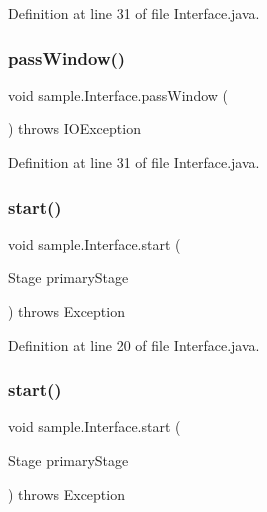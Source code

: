 Definition at line 31 of file Interface.\+java.

\mbox{\label{classsample_1_1_interface_a845d7280ea87f3cd86c8f30b997312dc}} 
\subsubsection{\texorpdfstring{pass\+Window()}{passWindow()}\hspace{0.1cm}{\footnotesize\ttfamily [2/2]}}
{\footnotesize\ttfamily void sample.\+Interface.\+pass\+Window (\begin{DoxyParamCaption}{ }\end{DoxyParamCaption}) throws I\+O\+Exception\hspace{0.3cm}{\ttfamily [inline]}}



Definition at line 31 of file Interface.\+java.

\mbox{\label{classsample_1_1_interface_a0226e93400c0b54f5f112eb32aeeae76}} 
\subsubsection{\texorpdfstring{start()}{start()}\hspace{0.1cm}{\footnotesize\ttfamily [1/2]}}
{\footnotesize\ttfamily void sample.\+Interface.\+start (\begin{DoxyParamCaption}\item[{Stage}]{primary\+Stage }\end{DoxyParamCaption}) throws Exception\hspace{0.3cm}{\ttfamily [inline]}}



Definition at line 20 of file Interface.\+java.

\mbox{\label{classsample_1_1_interface_a0226e93400c0b54f5f112eb32aeeae76}} 
\subsubsection{\texorpdfstring{start()}{start()}\hspace{0.1cm}{\footnotesize\ttfamily [2/2]}}
{\footnotesize\ttfamily void sample.\+Interface.\+start (\begin{DoxyParamCaption}\item[{Stage}]{primary\+Stage }\end{DoxyParamCaption}) throws Exception\hspace{0.3cm}{\ttfamily [inline]}}



